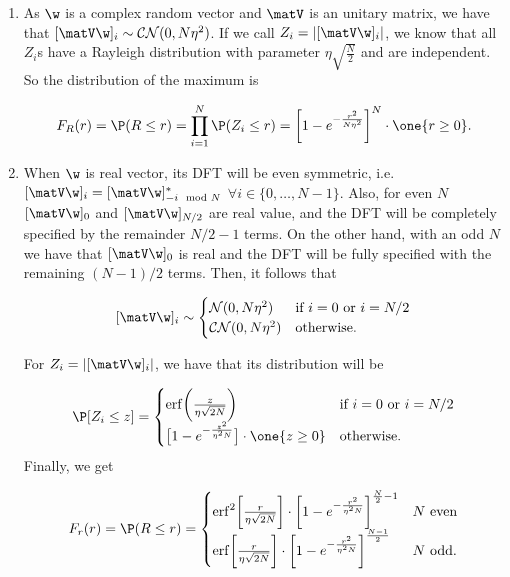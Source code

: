\begin{enumerate} 
	\item As $\w$ is a complex random vector and $\matV$ is an unitary matrix, we have that $[\matV\w]_i\sim \mathcal{CN}(0,N\eta^2)$. If we call $Z_i = |[\matV\w]_i|$, we know that all $Z_i$s have a Rayleigh distribution with parameter $\eta\sqrt{\frac{N}{2}}$ and are independent. So the distribution of the maximum is
	
	\[F_R(r) = \P(R\le r) = \prod_{i=1}^{N}\P(Z_i\le r) = \bigg[1 - e^{-\frac{r^2}{N\eta^2}}\bigg]^{N}\cdot\one\{r\ge0\}.\]
	
	\item When $\w$ is real vector, its DFT will be even symmetric, i.e. $[\matV\w]_i=[\matV\w]^*_{-i\mod N}$ $\forall i\in\{0,\ldots,N-1\}$. Also, for even $N$ $[\matV\w]_0$ and $[\matV\w]_{N/2}$ are real value, and the DFT will be completely specified by the remainder $N/2-1$ terms. On the other hand, with an odd $N$ we have that $[\matV\w]_0$ is real and the DFT will be fully specified with the remaining $(N-1)/2$ terms. Then, it follows that
	
	\[[\matV\w]_i \sim \begin{cases} \mathcal{N}(0,N\eta^2) & \text{if $i=0$ or $i = N/2$}\\
		\mathcal{CN}(0,N\eta^2) & \text{otherwise.}
	\end{cases}\] 
	
	For $Z_i = |[\matV\w]_i|$, we have that its distribution will be
	
	\[\P[Z_i\leq z] = \begin{cases} \mathrm{erf}\bigg(\frac{z}{\eta\sqrt{2N}}\bigg) & \text{if $i=0$ or $i = N/2$}\\[0.3em] \big[1-e^{-\frac{z^2}{\eta^2N}}\big]\cdot\one\{z\ge 0\} &  \text{otherwise.}
	\end{cases} \]
	Finally, we get
	
	\[F_r(r) = \P(R\le r) = \begin{cases}\mathrm{erf}^2\bigg[\frac{r}{\eta\sqrt{2N}}\bigg]\cdot\bigg[1-e^{-\frac{r^2}{\eta^2N}}\bigg]^{\frac{N}{2}-1} & \text{$N$ even}\\
		\mathrm{erf}\bigg[\frac{r}{\eta\sqrt{2N}}\bigg]\cdot\bigg[1-e^{-\frac{r^2}{\eta^2N}}\bigg]^{\frac{N-1}{2}} & \text{$N$ odd.}
	\end{cases}\]
	
\end{enumerate}






